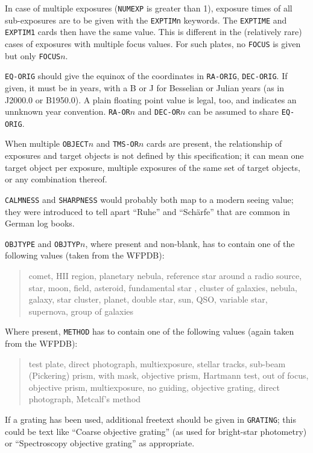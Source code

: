 \documentclass[11pt]{ivoa}
\newcommand\cardname[1]{\texttt{\color{keyword}#1}}
\begin{document}
In case of multiple exposures (\cardname{NUMEXP} is greater than 1),
exposure times of all sub-exposures are to be given with the
\cardname{EXPTIMn} keywords.  The \cardname{EXPTIME} and
\cardname{EXPTIM1} cards then have the same value.  This is different in
the (relatively rare) cases of exposures with multiple focus values.
For such plates, no \cardname{FOCUS} is given but only
\cardname{FOCUS$n$}.

\cardname{EQ-ORIG} should give the equinox of the coordinates in
\cardname{RA-ORIG}, \cardname{DEC-ORIG}.  If given, it must be in
years, with a B or J for Besselian or Julian years (as in J2000.0 or
B1950.0).  A plain floating point value is legal, too, and indicates
an unnknown year convention.  \cardname{RA-OR$n$} and
\cardname{DEC-OR$n$} can be assumed to share \cardname{EQ-ORIG}.

When multiple \cardname{OBJECT$n$} and \cardname{TMS-OR$n$} cards are
present, the relationship of exposures and target objects is not defined
by this specification; it can mean one target object per exposure,
multiple exposures of the same set of target objects, or any combination
thereof.

\cardname{CALMNESS} and \cardname{SHARPNESS} would probably both map to
a modern seeing value; they were introduced to tell apart ``Ruhe'' and
``Schärfe'' that are common in German log books.

\cardname{OBJTYPE} and \cardname{OBJTYP$n$}, where present and
non-blank, has to contain one of the following values (taken from the
WFPDB):

\begin{quotation}
\noindent comet, HII region, planetary nebula, reference star around a radio
source, star, moon, field, asteroid, fundamental star
, cluster of galaxies, nebula, galaxy, star cluster, planet, double
star, sun, QSO, variable star, supernova, group of galaxies
\end{quotation}

Where present, \cardname{METHOD} has to contain one of the following
values (again taken from the WFPDB):

\begin{quotation}
\noindent test plate, direct photograph, multiexposure, stellar tracks, sub-beam
(Pickering) prism, with mask, objective prism, Hartmann test, out of
focus, objective prism, multiexposure, no guiding, objective grating,
direct photograph, Metcalf's method
\end{quotation}

If a grating has been used, additional freetext should be given in
\cardname{GRATING}; this could be text like  ``Coarse objective
grating'' (as used for bright-star photometry) or ``Spectroscopy
objective grating'' as appropriate.
\end{document}
